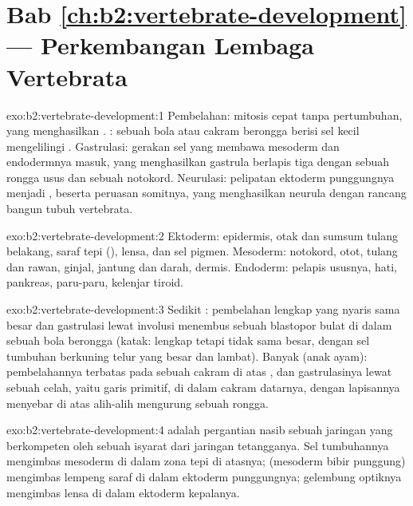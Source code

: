 \section*{Bab \ref{ch:b2:vertebrate-development} --- Perkembangan Lembaga Vertebrata}

\begin{solution}{exo:b2:vertebrate-development:1}
Pembelahan: mitosis cepat tanpa pertumbuhan, yang menghasilkan
. : sebuah bola atau cakram berongga berisi sel kecil
mengelilingi . Gastrulasi: gerakan sel yang membawa
mesoderm dan endodermnya masuk, yang menghasilkan gastrula berlapis
tiga dengan sebuah rongga usus dan sebuah notokord. Neurulasi:
pelipatan ektoderm punggungnya menjadi , beserta
peruasan somitnya, yang menghasilkan neurula dengan rancang bangun
tubuh vertebrata.
\end{solution}

\begin{solution}{exo:b2:vertebrate-development:2}
Ektoderm: epidermis, otak dan sumsum tulang belakang, saraf tepi (), lensa, dan sel pigmen. Mesoderm: notokord, otot, tulang dan
rawan, ginjal, jantung dan darah, dermis. Endoderm: pelapis ususnya,
hati, pankreas, paru-paru, kelenjar tiroid.
\end{solution}

\begin{solution}{exo:b2:vertebrate-development:3}
Sedikit : pembelahan lengkap yang nyaris sama besar dan
gastrulasi lewat involusi menembus sebuah blastopor bulat di dalam
sebuah bola berongga (katak: lengkap tetapi tidak sama besar, dengan
sel tumbuhan berkuning telur yang besar dan lambat). Banyak  (anak ayam): pembelahannya terbatas pada sebuah cakram di atas
, dan gastrulasinya lewat sebuah celah, yaitu garis
primitif, di dalam cakram datarnya, dengan lapisannya menyebar di atas
 alih-alih mengurung sebuah rongga.
\end{solution}

\begin{solution}{exo:b2:vertebrate-development:4}
 adalah pergantian nasib sebuah jaringan yang berkompeten
oleh sebuah isyarat dari jaringan tetangganya. Sel tumbuhannya mengimbas
mesoderm di dalam zona tepi di atasnya;  (mesoderm bibir
punggung) mengimbas lempeng saraf di dalam ektoderm punggungnya;
gelembung optiknya mengimbas lensa di dalam ektoderm kepalanya.
\end{solution}

